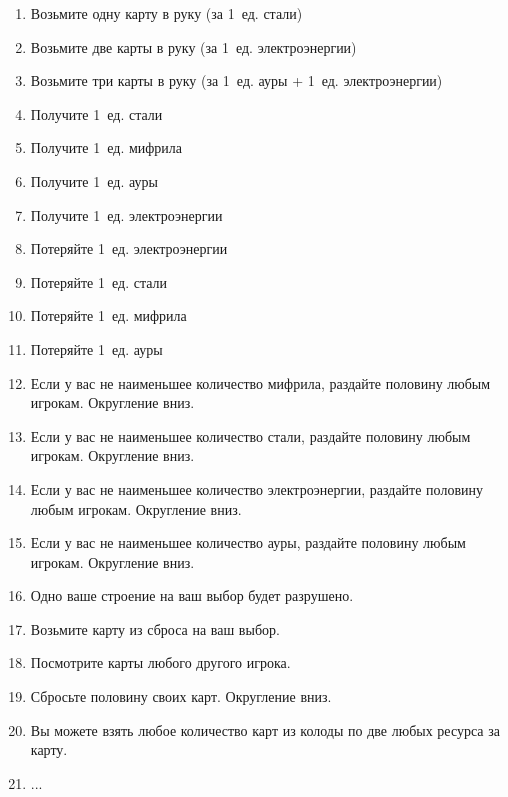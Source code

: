 \documentclass[a4paper,12pt]{article}
\begin{document}
      \begin{enumerate}
        \item Возьмите одну карту в руку (за 1~ед. стали)
        \item Возьмите две карты в руку (за 1~ед. электроэнергии)
        \item Возьмите три карты в руку (за 1~ед. ауры + 1~ед. электроэнергии)
        \item Получите 1~ед. стали
        \item Получите 1~ед. мифрила
        \item Получите 1~ед. ауры
        \item Получите 1~ед. электроэнергии
        \item Потеряйте 1~ед. электроэнергии
        \item Потеряйте 1~ед. стали
        \item Потеряйте 1~ед. мифрила
        \item Потеряйте 1~ед. ауры
        \item Если у вас не наименьшее количество мифрила, раздайте половину любым игрокам. Округление вниз.
        \item Если у вас не наименьшее количество стали, раздайте половину любым игрокам. Округление вниз.
        \item Если у вас не наименьшее количество электроэнергии, раздайте половину любым игрокам. Округление вниз.
        \item Если у вас не наименьшее количество ауры, раздайте половину любым игрокам. Округление вниз.
        \item Одно ваше строение на ваш выбор будет разрушено.
        \item Возьмите карту из сброса на ваш выбор.
        \item Посмотрите карты любого другого игрока.
        \item Сбросьте половину своих карт. Округление вниз.
        \item Вы можете взять любое количество карт из колоды по две любых ресурса за карту.
        \item ...
      \end{enumerate}
\end{document}

